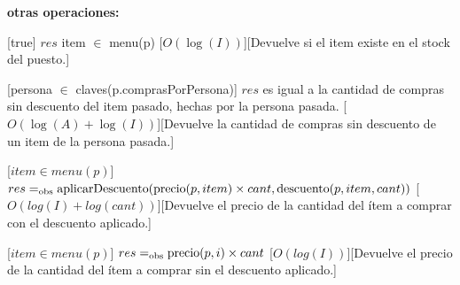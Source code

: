 \documentclass[../main.tex]{subfiles}
\begin{document}
\begin{interfaz}
{\textbf{otras operaciones: }

[true]
{$res$ \igobs item $\in$ menu(p)}
[$O(\log(I))$][Devuelve si el item existe en el stock del puesto.]

[persona $\in$ claves(p.comprasPorPersona)]
{$res$ es igual a la cantidad de compras sin descuento del item pasado, hechas por la persona pasada.}
[$O(\log(A) + \log(I))$][Devuelve la cantidad de compras sin descuento de un item de la persona pasada.]

[$item \in menu(p)$]
{$res =_{\mathrm{obs}} \text{aplicarDescuento}(\text{precio}(p, item) \times cant, \text{descuento}(p, item, cant))$}
[$O(log (I) + log (cant))$][Devuelve el precio de la cantidad del ítem a comprar con el descuento aplicado.]

[$item \in menu(p)$]
{$res =_{\mathrm{obs}} \text{precio}(p, i) \times cant$}
[$O(log (I))$][Devuelve el precio de la cantidad del ítem a comprar sin el descuento aplicado.]





}
\end{interfaz}
\end{document}

